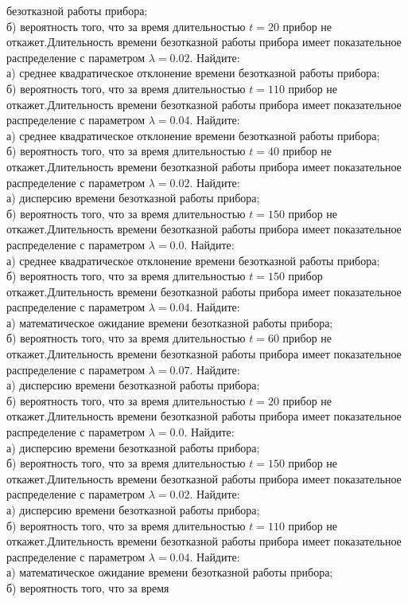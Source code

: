безотказной работы прибора; \\ \quad б) вероятность того, что за время длительностью $t = 20$ прибор не откажет.Длительность времени безотказной работы прибора имеет показательное распределение с параметром $\lambda = 0.02$. Найдите: \\ \quad а) среднее квадратическое отклонение времени безотказной работы прибора; \\ \quad б) вероятность того, что за время длительностью $t = 110$ прибор не откажет.Длительность времени безотказной работы прибора имеет показательное распределение с параметром $\lambda = 0.04$. Найдите: \\ \quad а) среднее квадратическое отклонение времени безотказной работы прибора; \\ \quad б) вероятность того, что за время длительностью $t = 40$ прибор не откажет.Длительность времени безотказной работы прибора имеет показательное распределение с параметром $\lambda = 0.02$. Найдите: \\ \quad а) дисперсию времени безотказной работы прибора; \\ \quad б) вероятность того, что за время длительностью $t = 150$ прибор не откажет.Длительность времени безотказной работы прибора имеет показательное распределение с параметром $\lambda = 0.0$. Найдите: \\ \quad а) среднее квадратическое отклонение времени безотказной работы прибора; \\ \quad б) вероятность того, что за время длительностью $t = 150$ прибор откажет.Длительность времени безотказной работы прибора имеет показательное распределение с параметром $\lambda = 0.04$. Найдите: \\ \quad а) математическое ожидание времени безотказной работы прибора; \\ \quad б) вероятность того, что за время длительностью $t = 60$ прибор не откажет.Длительность времени безотказной работы прибора имеет показательное распределение с параметром $\lambda = 0.07$. Найдите: \\ \quad а) дисперсию времени безотказной работы прибора; \\ \quad б) вероятность того, что за время длительностью $t = 20$ прибор не откажет.Длительность времени безотказной работы прибора имеет показательное распределение с параметром $\lambda = 0.0$. Найдите: \\ \quad а) дисперсию времени безотказной работы прибора; \\ \quad б) вероятность того, что за время длительностью $t = 150$ прибор не откажет.Длительность времени безотказной работы прибора имеет показательное распределение с параметром $\lambda = 0.02$. Найдите: \\ \quad а) дисперсию времени безотказной работы прибора; \\ \quad б) вероятность того, что за время длительностью $t = 110$ прибор не откажет.Длительность времени безотказной работы прибора имеет показательное распределение с параметром $\lambda = 0.04$. Найдите: \\ \quad а) математическое ожидание времени безотказной работы прибора; \\ \quad б) вероятность того, что за время 